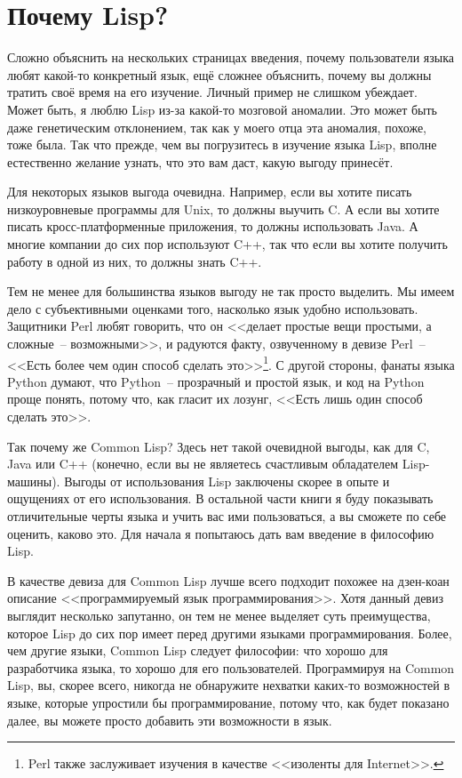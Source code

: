 \section{Почему Lisp?}

Сложно объяснить на нескольких страницах введения, почему пользователи языка любят
какой-то конкретный язык, ещё сложнее объяснить, почему вы должны тратить своё время на
его изучение. Личный пример не слишком убеждает. Может быть, я люблю Lisp из-за какой-то
мозговой аномалии. Это может быть даже генетическим отклонением, так
как у моего отца эта аномалия, похоже, тоже была. Так что прежде, чем вы погрузитесь в изучение языка
Lisp, вполне естественно желание узнать, что это вам даст, какую выгоду
принесёт.

Для некоторых языков выгода очевидна. Например, если вы хотите писать низкоуровневые
программы для Unix, то должны выучить C. А если вы хотите писать кросс-платформенные
приложения, то должны использовать Java. А многие компании до сих пор используют
C++, так что если вы хотите получить работу в одной из них, то должны знать C++.

Тем не менее для большинства языков выгоду не так просто выделить. Мы имеем дело с
субъективными оценками того, насколько язык удобно использовать. Защитники Perl любят
говорить, что он <<делает простые вещи простыми, а сложные~-- возможными>>, и радуются факту,
озвученному в девизе Perl~-- <<Есть более чем один способ сделать это>>\footnote{Perl
  также заслуживает изучения в качестве <<изоленты для Internet>>.}. С другой стороны,
фанаты языка Python думают, что Python~-- прозрачный и простой язык, и код на Python проще
понять, потому что, как гласит их лозунг, <<Есть лишь один способ сделать это>>.

Так почему же Common Lisp? Здесь нет такой очевидной выгоды, как для C, Java или C++
(конечно, если вы не являетесь счастливым обладателем Lisp-машины). Выгоды от использования
Lisp заключены скорее в опыте и ощущениях от его использования. В остальной части книги
я буду показывать отличительные черты языка и учить вас ими пользоваться, а вы сможете
по себе оценить, каково это. Для начала я попытаюсь дать вам введение в философию Lisp.

В качестве девиза для Common Lisp лучше всего подходит похожее на дзен-коан описание
<<программируемый язык программирования>>. Хотя данный девиз выглядит несколько запутанно,
он тем не менее выделяет суть преимущества, которое Lisp до сих пор имеет перед другими
языками программирования. Более, чем другие языки, Common Lisp следует философии: что
хорошо для разработчика языка, то хорошо для его пользователей. Программируя на Common
Lisp, вы, скорее всего, никогда не обнаружите нехватки каких-то возможностей в языке,
которые упростили бы программирование, потому что, как будет показано далее, вы можете
просто добавить эти возможности в язык.

